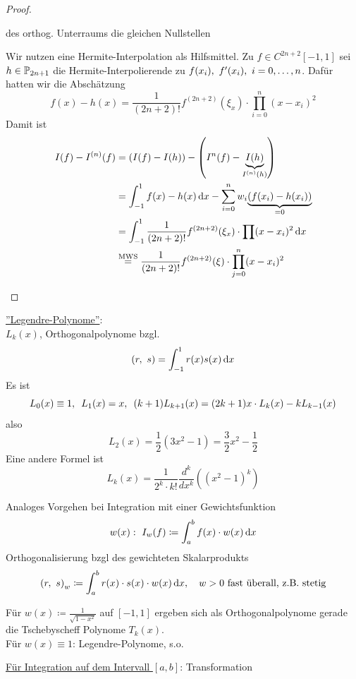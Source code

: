 \documentclass[../Skript.tex]{subfiles}
\begin{document}
{\begin{proof}
\begin{description}
    des orthog. Unterraums
    die gleichen Nullstellen
    \item[Fehlerabschätzung:]
    Wir nutzen eine Hermite-Interpolation als Hilfsmittel. Zu $f\in 
    C^{2n+2}[-1,1]$ sei
    $h \in \Pol{2n+1}$ die Hermite-Interpolierende zu $f(x_i), \ f'(x_i), 
    \ \igb i 0 n$. Dafür hatten
    wir die Abschätzung\[
        f(x) - h(x) = \frac{1}{(2n+2)!} f^{(2n+2)}(\xi_x)
        \cdot\prod_{i=0}^n (x-x_i)^2\]
    Damit ist 
    \begin{align*}
        I(f) - I^{(n)}(f) &= \left(I(f) - I(h)\right) - \left(I^{n}(f) - 
        \underset{I^{(n)}(h)}{\underbrace{I(h)}}\right)\\
        &= \int_{-1}^1 f(x)-h(x)\mathop{}\!\mathrm{d} x - \sum_{i=0}^n w_i\underset{=0}
        {\underbrace{(f(x_i) - h(x_i))}}\\
        &= \int_{-1}^1 \frac{1}{(2n+2)!}f^{(2n+2)}(\xi_x)\cdot\prod(x-
        x_i)^2\mathop{}\!\mathrm{d} x\\
        &\overset{\text{MWS}}{=} \frac{1}{(2n+2)!}f^{(2n+2)}(\xi)\cdot
        \prod_{j=0}^n(x-x_i)^2
    \end{align*}
    \end{description}
\end{proof}
\underline{''Legendre-Polynome''}:\\
    $L_k(x)$, Orthogonalpolynome bzgl. \[\left(r,\ s\right) = \int_{-1}^1 
    r(x)s(x)\mathop{}\!\mathrm{d} x\]
    Es ist \[
        L_0(x) \equiv 1, \hspace{.5em} L_1(x) = x, \hspace{.5em} (k+1)L_{k+1}(x) 
        = (2k+1)x\cdot L_k(x) - kL_{k-1}(x)\]
    also \[
        L_2(x) = \frac{1}{2}(3x^2 - 1) = \frac{3}{2}x^2 - \frac{1}{2}\]
    Eine andere Formel ist \[
        L_k(x) = \frac{1}{2^k\cdot k!}\frac{d^k}{dx^k}\left((x^2-1)^k
        \right)\]
\begin{remark}
    Analoges Vorgehen bei Integration mit einer Gewichtsfunktion \[
        w(x): \ I_w(f) \coloneqq \int_a^b f(x)\cdot w(x)\mathop{}\!\mathrm{d} x\]
    Orthogonalisierung bzgl des gewichteten Skalarprodukts \[
        \left(r,\ s\right)_w \coloneqq \int_a^b r(x)\cdot s(x)\cdot w(x)\mathop{}\!\mathrm{d} x, 
        \hspace{1em} w>0\text{ fast überall, z.B. stetig}\]
\end{remark}
\begin{example}
    Für $w(x) \coloneqq \frac{1}{\sqrt{1-x^2}}$ auf $[-1,1]$ ergeben sich 
    als Orthogonalpolynome 
    gerade die Tschebyscheff Polynome $T_k(x)$.\\
    Für $w(x)\equiv 1$: Legendre-Polynome, s.o.
\end{example}
\underline{Für Integration auf dem Intervall $[a,b]$}: Transformation 
}
\end{document}
